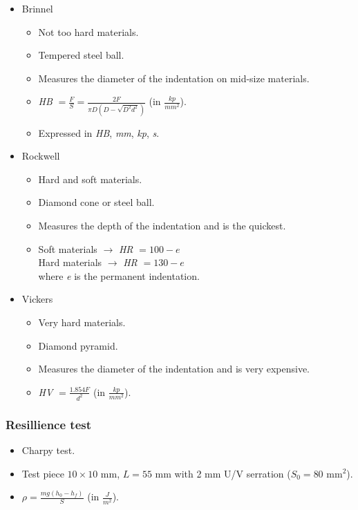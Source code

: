 \documentclass{article}
\begin{document}
\begin{itemize}
    \item Brinnel
    \begin{itemize}
        \item Not too hard materials.
        \item Tempered steel ball.
        \item Measures the diameter of the indentation on mid-size materials.
        \item \emph{HB} $= \frac{F}{S} = \frac{2F}{\pi D\left(D - \sqrt{D^2 d^2}
        \right) }$ (in $\frac{kp}{mm^2}$).
        \item Expressed in \emph{HB}, \emph{mm}, \emph{kp}, \emph{s}.
    \end{itemize}
    \item Rockwell
    \begin{itemize}
        \item Hard and soft materials.
        \item Diamond cone or steel ball.
        \item Measures the depth of the indentation and is the quickest.
        \item Soft materials $\rightarrow$ \emph{HR} $= 100 - e$ \\ Hard
        materials $\rightarrow$ \emph{HR} $= 130 - e$ \\ where \emph{e} is the
        permanent indentation.
    \end{itemize}
    \item Vickers
    \begin{itemize}
        \item Very hard materials.
        \item Diamond pyramid.
        \item Measures the diameter of the indentation and is very expensive.
        \item \emph{HV} $= \frac{1.854 F}{d^2}$ (in $\frac{kp}{mm^2}$).
    \end{itemize}
\end{itemize}

\subsubsection*{Resillience test}

\begin{itemize}
    \item Charpy test.
    \item Test piece $10 \times 10$ mm, $L = 55$ mm with 2 mm U/V serration
    ($S_0 = 80$ mm$^2$).
    \item $\rho = \frac{m g \left(h_0 - h_f\right)}{S}$ (in $\frac{J}{m^2}$).
\end{itemize}
\end{document}
